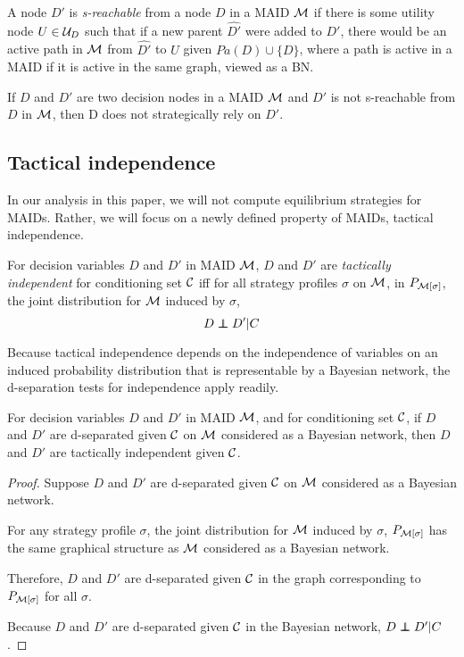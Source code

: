 \documentclass[../thesis.tex]{subfiles}
\begin{document}
\begin{dfn}[s-reachable]
  \label{dfn:s-reachable}
  A node $D'$ is \emph{s-reachable} from a node $D$ in a MAID
  $\mathcal{M}$ if there is some utility node $U \in \mathcal{U}_D$ such
  that if a new parent $\widehat{D'}$ were added to $D'$, there would
  be an active path in $\mathcal{M}$ from $\widehat{D'}$ to $U$ given
  $Pa(D) \cup \{D\}$, where a path is active in a MAID if it
  is active in the same graph, viewed as a BN.
\end{dfn}

\begin{thm}
  \label{thm:strategic-non-reliance}
  If $D$ and $D'$ are two decision nodes in a MAID $\mathcal{M}$
  and $D'$ is not s-reachable from $D$ in $\mathcal{M}$, then D
  does not strategically rely on $D'$.
\end{thm}

\subsection{Tactical independence}

In our analysis in this paper, we will not compute
equilibrium strategies for MAIDs.
Rather, we will focus on a newly defined property
of MAIDs, tactical independence.

\begin{dfn}
  \label{dfn:tactical-independence}
  For decision variables $D$ and $D'$ in MAID $\mathcal{M}$,
  $D$ and $D'$ are \emph{tactically independent} for
  conditioning set $\mathcal{C}$ iff
  for all strategy profiles $\sigma$ on $\mathcal{M}$,
  in $P_{\mathcal{M}[\sigma]}$, the joint distribution for
  $\mathcal{M}$ induced by $\sigma$,
  $$D \independent D' \vert C$$
\end{dfn}

Because tactical independence depends on the
independence of variables on an induced probability
distribution that is representable by a Bayesian
network, the d-separation tests for independence
apply readily.

\begin{thm}
  For decision variables $D$ and $D'$ in MAID $\mathcal{M}$,
  and for conditioning set $\mathcal{C}$, if
  $D$ and $D'$ are d-separated given $\mathcal{C}$ on
  $\mathcal{M}$ considered as a Bayesian network,
  then $D$ and $D'$ are tactically independent
  given $\mathcal{C}$.
\end{thm}

\begin{proof}
  Suppose $D$ and $D'$ are d-separated given $\mathcal{C}$
  on $\mathcal{M}$ considered as a Bayesian network.

  For any strategy profile $\sigma$,
  the joint distribution for $\mathcal{M}$
  induced by $\sigma$, $P_{\mathcal{M}[\sigma]}$
  has the same graphical structure as $\mathcal{M}$
  considered as a Bayesian network.

  Therefore, $D$ and $D'$ are d-separated given $\mathcal{C}$
  in the graph corresponding to $P_{\mathcal{M}[\sigma]}$
  for all $\sigma$.

  Because $D$ and $D'$ are d-separated given $\mathcal{C}$
  in the Bayesian network, $D \independent D' \vert C$.
\end{proof}
\end{document}

